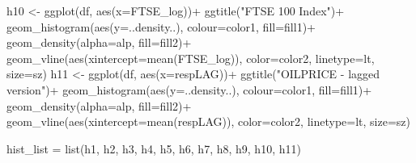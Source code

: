 \documentclass[
]{article}
\newenvironment{Shaded}{\begin{snugshade}}{\end{snugshade}}
\newcommand{\AttributeTok}[1]{\textcolor[rgb]{0.77,0.63,0.00}{#1}}
\newcommand{\FunctionTok}[1]{\textcolor[rgb]{0.00,0.00,0.00}{#1}}
\newcommand{\NormalTok}[1]{#1}
\newcommand{\OtherTok}[1]{\textcolor[rgb]{0.56,0.35,0.01}{#1}}
\newcommand{\SpecialCharTok}[1]{\textcolor[rgb]{0.00,0.00,0.00}{#1}}
\newcommand{\StringTok}[1]{\textcolor[rgb]{0.31,0.60,0.02}{#1}}
\begin{document}
\begin{Shaded}
\begin{Highlighting}[]
\NormalTok{h10 }\OtherTok{\textless{}{-}} \FunctionTok{ggplot}\NormalTok{(df, }\FunctionTok{aes}\NormalTok{(}\AttributeTok{x=}\NormalTok{FTSE\_log))}\SpecialCharTok{+} \FunctionTok{ggtitle}\NormalTok{(}\StringTok{"FTSE 100 Index"}\NormalTok{)}\SpecialCharTok{+}
  \FunctionTok{geom\_histogram}\NormalTok{(}\FunctionTok{aes}\NormalTok{(}\AttributeTok{y=}\NormalTok{..density..), }\AttributeTok{colour=}\NormalTok{color1, }\AttributeTok{fill=}\NormalTok{fill1)}\SpecialCharTok{+}
  \FunctionTok{geom\_density}\NormalTok{(}\AttributeTok{alpha=}\NormalTok{alp, }\AttributeTok{fill=}\NormalTok{fill2)}\SpecialCharTok{+}
  \FunctionTok{geom\_vline}\NormalTok{(}\FunctionTok{aes}\NormalTok{(}\AttributeTok{xintercept=}\FunctionTok{mean}\NormalTok{(FTSE\_log)), }\AttributeTok{color=}\NormalTok{color2, }\AttributeTok{linetype=}\NormalTok{lt, }\AttributeTok{size=}\NormalTok{sz)}
\NormalTok{h11 }\OtherTok{\textless{}{-}} \FunctionTok{ggplot}\NormalTok{(df, }\FunctionTok{aes}\NormalTok{(}\AttributeTok{x=}\NormalTok{respLAG))}\SpecialCharTok{+} \FunctionTok{ggtitle}\NormalTok{(}\StringTok{"OILPRICE {-} lagged version"}\NormalTok{)}\SpecialCharTok{+}
  \FunctionTok{geom\_histogram}\NormalTok{(}\FunctionTok{aes}\NormalTok{(}\AttributeTok{y=}\NormalTok{..density..), }\AttributeTok{colour=}\NormalTok{color1, }\AttributeTok{fill=}\NormalTok{fill1)}\SpecialCharTok{+}
  \FunctionTok{geom\_density}\NormalTok{(}\AttributeTok{alpha=}\NormalTok{alp, }\AttributeTok{fill=}\NormalTok{fill2)}\SpecialCharTok{+}
  \FunctionTok{geom\_vline}\NormalTok{(}\FunctionTok{aes}\NormalTok{(}\AttributeTok{xintercept=}\FunctionTok{mean}\NormalTok{(respLAG)), }\AttributeTok{color=}\NormalTok{color2, }\AttributeTok{linetype=}\NormalTok{lt, }\AttributeTok{size=}\NormalTok{sz)}

\NormalTok{hist\_list }\OtherTok{=} \FunctionTok{list}\NormalTok{(h1, h2, h3, h4, h5, h6, h7, h8, h9, h10, h11)}


\end{Highlighting}
\end{Shaded}
\end{document}
